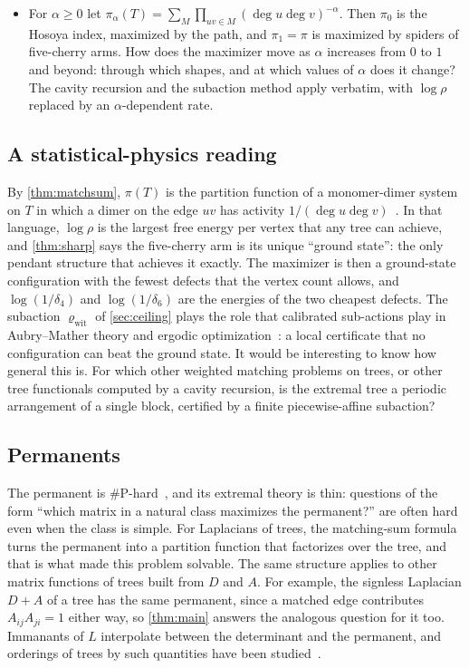 \documentclass[11pt]{article}
\theoremstyle{definition}
\renewcommand{\deg}{\operatorname{deg}}
\begin{document}
\begin{itemize}
\item For $\alpha\ge0$ let $\pi_\alpha(T)=\sum_M\prod_{uv\in M}(\deg u\deg v)^{-\alpha}$. Then $\pi_0$ is
  the Hosoya index, maximized by the path, and $\pi_1=\pi$ is maximized by spiders of five-cherry arms.
  How does the maximizer move as $\alpha$ increases from $0$ to $1$ and beyond: through which shapes, and
  at which values of $\alpha$ does it change? The cavity recursion and the subaction method apply
  verbatim, with $\log\rho$ replaced by an $\alpha$-dependent rate.
\end{itemize}

\subsection{A statistical-physics reading}

By \cref{thm:matchsum}, $\pi(T)$ is the partition function of a monomer-dimer system on $T$ in which a
dimer on the edge $uv$ has activity $1/(\deg u\deg v)$~\cite{HL1972}. In that language, $\log\rho$ is the
largest free energy per vertex that any tree can achieve, and \cref{thm:sharp} says the five-cherry arm is
its unique ``ground state'': the only pendant structure that achieves it exactly. The maximizer is then a
ground-state configuration with the fewest defects that the vertex count allows, and $\log(1/\delta_4)$ and
$\log(1/\delta_6)$ are the energies of the two cheapest defects. The subaction $\varrho_{\mathrm{wit}}$ of
\cref{sec:ceiling} plays the role that calibrated sub-actions play in Aubry--Mather theory and ergodic
optimization~\cite{Bousch2001,Jenkinson2019}: a local certificate that no configuration can beat the
ground state. It would be interesting to know how general this is. For which other weighted matching
problems on trees, or other tree functionals computed by a cavity recursion, is the extremal tree a
periodic arrangement of a single block, certified by a finite piecewise-affine subaction?

\subsection{Permanents}

The permanent is \#P-hard~\cite{Valiant1979}, and its extremal theory is thin: questions of the form
``which matrix in a natural class maximizes the permanent?'' are often hard even when the class is
simple. For Laplacians of trees, the matching-sum formula turns the permanent into a partition function
that factorizes over the tree, and that is what made this problem solvable. The same structure applies
to other matrix functions of trees built from $D$ and $A$. For example, the signless Laplacian $D+A$ of a
tree has the same permanent, since a matched edge contributes $A_{ij}A_{ji}=1$ either way, so
\cref{thm:main} answers the analogous question for it too. Immanants of $L$ interpolate between the
determinant and the permanent, and orderings of trees by such quantities have been
studied~\cite{Csikvari2010}.
\end{document}

